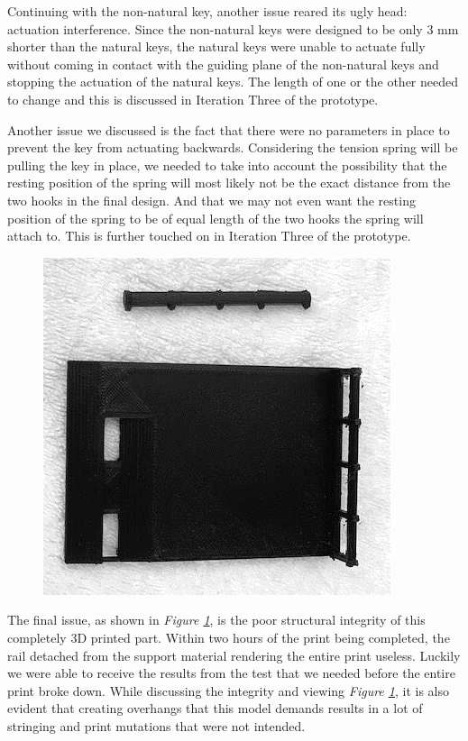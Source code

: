 Continuing with the non-natural key, another issue reared its ugly head: actuation interference. Since the non-natural keys were designed to be only 3 mm shorter than the natural keys, the natural keys were unable to actuate fully without coming in contact with the guiding plane of the non-natural keys and stopping the actuation of the natural keys. The length of one or the other needed to change and this is discussed in Iteration Three of the prototype.

Another issue we discussed is the fact that there were no parameters in place to prevent the key from actuating backwards. Considering the tension spring will be pulling the key in place, we needed to take into account the possibility that the resting position of the spring will most likely not be the exact distance from the two hooks in the final design. And that we may not even want the resting position of the spring to be of equal length of the two hooks the spring will attach to. This is further touched on in Iteration Three of the prototype.

\begin{figure}[h!]
  \centering
  \includegraphics[width=0.8\linewidth]{image/Print4.png}
  \caption{}
  \label{fig:print4}
\end{figure}

The final issue, as shown in \textit{Figure \ref{fig:print4}}, is the poor structural integrity of this completely 3D printed part. Within two hours of the print being completed, the rail detached from the support material rendering the entire print useless. Luckily we were able to receive the results from the test that we needed before the entire print broke down. While discussing the integrity and viewing \textit{Figure \ref{fig:print4}}, it is also evident that creating overhangs that this model demands results in a lot of stringing and print mutations that were not intended.

